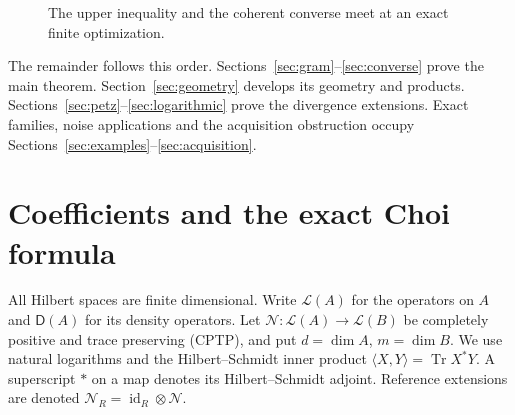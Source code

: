 \documentclass[11pt]{article}
\numberwithin{equation}{section}
\theoremstyle{definition}
\theoremstyle{remark}
\DeclareMathOperator{\Tr}{Tr}
\DeclareMathOperator{\id}{id}
\newcommand{\N}{\mathcal N}
\newcommand{\ip}[2]{\langle #1,#2\rangle}
\newcommand{\States}{\mathsf D}
\begin{document}
\begin{figure}[htbp]
\centering
{}
\caption{The upper inequality and the coherent converse meet at an exact
finite optimization.}
\label{fig:proof}
\end{figure}

The remainder follows this order. Sections~\ref{sec:gram}--\ref{sec:converse}
prove the main theorem. Section~\ref{sec:geometry} develops its geometry and
products. Sections~\ref{sec:petz}--\ref{sec:logarithmic} prove the divergence
extensions. Exact families, noise applications and the acquisition obstruction
occupy Sections~\ref{sec:examples}--\ref{sec:acquisition}.
\clearpage

\section{Coefficients and the exact Choi formula}
\label{sec:definitions}

All Hilbert spaces are finite dimensional. Write $\mathcal L(A)$ for the
operators on $A$ and $\States(A)$ for its density operators. Let
$\N:\mathcal L(A)\to\mathcal L(B)$ be completely positive and trace preserving
(CPTP), and put $d=\dim A$, $m=\dim B$. We use natural logarithms and the
Hilbert--Schmidt inner product $\ip{X}{Y}=\Tr X^*Y$. A superscript $*$ on a map
denotes its Hilbert--Schmidt adjoint. Reference extensions are denoted
$\N_R=\id_R\otimes\N$.
\end{document}
